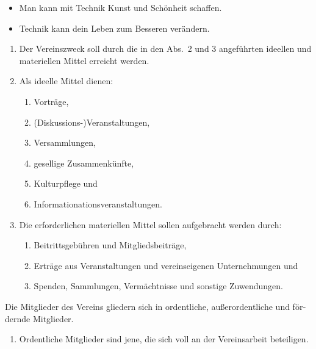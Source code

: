 \begin{otherlanguage}{german}
\begin{itemize}[statutenenum]
    \item Man kann mit Technik Kunst und Schönheit schaffen.

    \item Technik kann dein Leben zum Besseren verändern.
\end{itemize}


\begin{enumerate}[statutenenum]
    \item Der Vereinszweck soll durch die in den Abs.\ 2 und 3 angeführten ideellen und materiellen Mittel erreicht werden.

    \item Als ideelle Mittel dienen:
        \begin{enumerate}[statutenenum]
            \item Vorträge,
            \item (Diskussions-)Veranstaltungen,
            \item Versammlungen,
            \item gesellige Zusammenkünfte,
            \item Kulturpflege und
            \item Informationationsveranstaltungen.
        \end{enumerate}

    \item Die erforderlichen materiellen Mittel sollen aufgebracht werden durch:
        \begin{enumerate}[statutenenum]
            \item Beitrittsgebühren und Mitgliedsbeiträge,

            \item Erträge aus Veranstaltungen und vereinseigenen Unternehmungen und

            \item Spenden, Sammlungen, Vermächtnisse und sonstige Zuwendungen.
        \end{enumerate}
\end{enumerate}


Die Mitglieder des Vereins gliedern sich in ordentliche, außerordentliche
und fördernde Mitglieder.

\begin{enumerate}[statutenenum]
    \item Ordentliche Mitglieder sind jene, die sich voll an der Vereinsarbeit beteiligen.


\end{enumerate}
\end{otherlanguage}
